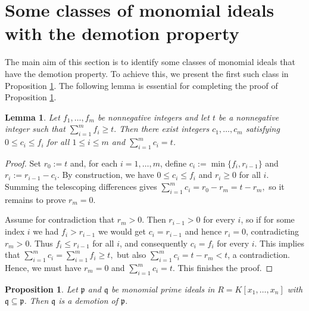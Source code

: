 \documentclass[11pt]{amsart}
\newtheorem{lemma}[theorem]{Lemma}
\newtheorem{proposition}[theorem]{Proposition}
\begin{document}

\section{Some classes of monomial ideals with the demotion property} \label{Section 4}

 The main aim of this section is to identify some classes of monomial ideals that have the demotion property. To achieve this, we present the first such class in Proposition \ref{Demotion-1}. The following lemma is essential for completing the proof of Proposition \ref{Demotion-1}.


\begin{lemma} \label{lem:bounded-sum}
Let $f_1,\dots,f_m$ be nonnegative integers and let $t$ be a nonnegative integer such that $\sum_{i=1}^m f_i \ge t.$ 
Then there exist integers $c_1,\dots,c_m$ satisfying $0\le c_i\le f_i$ for all $1\leq i \leq m$ and $\sum_{i=1}^m c_i=t$.
\end{lemma}

\begin{proof}
Set $r_0:=t$ and, for each $i=1,\dots,m$, define  $c_i:=\min\{f_i,r_{i-1}\}$ and $r_i:=r_{i-1}-c_i.$ 
By construction, we have  $0\le c_i\le f_i$ and $r_i\ge0$ for all $i$. Summing the telescoping differences gives $\sum_{i=1}^m c_i = r_0 - r_m = t - r_m,$ 
so it remains to prove $r_m=0$.

Assume for contradiction that $r_m>0$. Then $r_{i-1}>0$ for every $i$, so if for some index $i$ we had $f_i>r_{i-1}$ we would get $c_i=r_{i-1}$ and hence $r_i=0$, contradicting $r_m>0$. Thus $f_i\le r_{i-1}$ for all $i$, and consequently $c_i=f_i$ for every $i$. This implies that $\sum_{i=1}^m c_i = \sum_{i=1}^m f_i \ge t,$ 
 but also $\sum_{i=1}^m c_i = t-r_m < t$, a contradiction. Hence, we must have  $r_m=0$ and $\sum_{i=1}^m c_i=t$. This finishes the proof. 
\end{proof}


\begin{proposition} \label{Demotion-1}
Let $\mathfrak{p}$ and $\mathfrak{q}$ be monomial prime ideals in 
$R = K[x_1, \dots, x_n]$ with $\mathfrak{q} \subseteq \mathfrak{p}$. 
Then $\mathfrak{q}$ is a demotion of $\mathfrak{p}$.
\end{proposition}
\end{document}
